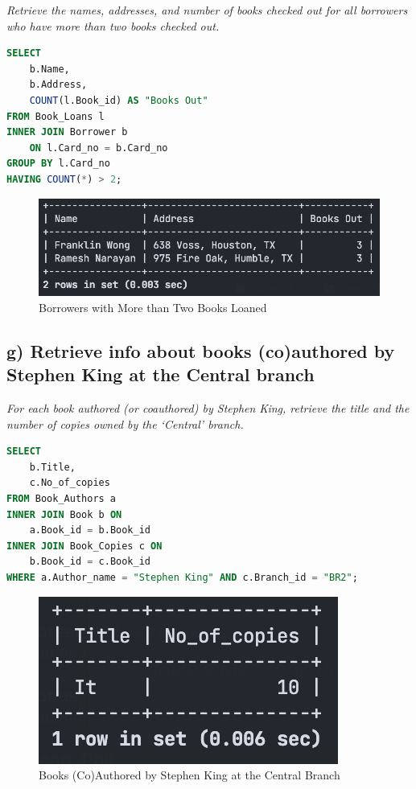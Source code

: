 \documentclass{article}
\begin{document}
\textit{Retrieve the names, addresses, and number of books checked out for all borrowers who
have more than two books checked out.}

\begin{lstlisting}[language=SQL,
    deletekeywords={IDENTITY},
    deletekeywords={[2]INT},
    morekeywords={clustered},
    framesep=8pt,
    xleftmargin=40pt,
    framexleftmargin=40pt,
    frame=tb,
    framerule=0pt ]
SELECT
    b.Name,
    b.Address,
    COUNT(l.Book_id) AS "Books Out"
FROM Book_Loans l
INNER JOIN Borrower b
    ON l.Card_no = b.Card_no
GROUP BY l.Card_no
HAVING COUNT(*) > 2;
\end{lstlisting}

\begin{figure}[!h]
    \centering
    \includegraphics[scale=0.6]{images/q4-f-results.png}
    \caption{Borrowers with More than Two Books Loaned}
    \label{fig:q4_f_borrowers}
\end{figure}

\subsection{g) Retrieve info about books (co)authored by Stephen King at the Central branch}

\textit{For each book authored (or coauthored) by Stephen King, retrieve the title and the
number of copies owned by the `Central' branch.}

\begin{lstlisting}[language=SQL,
    deletekeywords={IDENTITY},
    deletekeywords={[2]INT},
    morekeywords={clustered},
    framesep=8pt,
    xleftmargin=40pt,
    framexleftmargin=40pt,
    frame=tb,
    framerule=0pt ]
SELECT
    b.Title,
    c.No_of_copies
FROM Book_Authors a
INNER JOIN Book b ON
    a.Book_id = b.Book_id   
INNER JOIN Book_Copies c ON
    b.Book_id = c.Book_id
WHERE a.Author_name = "Stephen King" AND c.Branch_id = "BR2";
\end{lstlisting}

\begin{figure}[!h]
    \centering
    \includegraphics[scale=0.6]{images/q4-g-results.png}
    \caption{Books (Co)Authored by Stephen King at the Central Branch}
    \label{fig:q4_g_books}
\end{figure}
\end{document}
